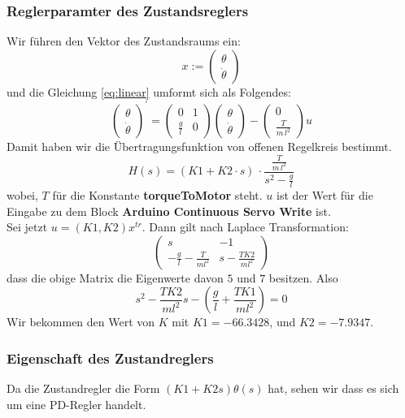 \documentclass{article}
\newcommand{\geru}{\"{u}}
\begin{document}
\subsubsection{Reglerparamter des Zustandsreglers}
Wir f\geru hren den Vektor des Zustandsraums ein:
\[
 x := \begin{pmatrix}
  \theta\\
  \dot{\theta}
\end{pmatrix}
\]
und die Gleichung \ref{eq:linear} umformt sich als Folgendes:
\[
\begin{pmatrix}
  \theta\\
  \dot{\theta}
\end{pmatrix} ^{\prime}= 
\begin{pmatrix}
 0 & 1 \\
 \frac{g}{l} & 0
\end{pmatrix}
\begin{pmatrix}
  \theta\\
  \dot{\theta}
\end{pmatrix} - 
\begin{pmatrix}
  0\\
  \frac{T}{m\,l^2}
\end{pmatrix} u
\]
Damit haben wir die Übertragungsfunktion von offenen Regelkreis bestimmt.
\[
	H(s) = (K1 + K2 \cdot s) \, \cdot \frac{\frac{T}{m\,l^2}}{s^2 - \frac{g}{l}}
\]
wobei, $T$ für die Konstante \textbf{torqueToMotor} steht. $u$ ist der Wert f\geru r die Eingabe zu dem Block \textbf{Arduino Continuous Servo Write} ist.\\ 
Sei jetzt $u = (K1, K2)x^{tr}$. Dann gilt nach Laplace Transformation:
\[
  \begin{pmatrix}
    s & -1\\
    -\frac{g}{l} - \frac{T}{m l^2} & s - \frac{T K2}{m l^2}
   \end{pmatrix}
\]
dass die obige Matrix die Eigenwerte davon $5$ und $7$ besitzen. Also
\begin{equation}\label{eq:k12}
  s^2 - \frac{T K2}{ml^2}s - (\frac{g}{l} + \frac{TK1}{ml^2}) = 0
\end{equation}
Wir bekommen den Wert von $K$ mit $K1 = -66.3428$, und $K2 = -7.9347$. 
\subsubsection{Eigenschaft des Zustandreglers}
Da die Zustandregler die Form $(K1 + K2 s)\theta(s)$ hat, sehen wir dass es sich um eine PD-Regler handelt.
\end{document}
